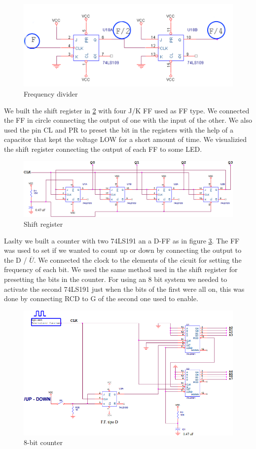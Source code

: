 \begin{figure}[H]
\centering
\includegraphics[width=.7\textwidth]{11/f_div.png}
\caption{Frequency divider}\label{f_div}
\end{figure}
We built the shift register in \ref{shift_reg} with four J/K FF used as FF type. We connected the FF in circle connecting the output of one with the input of the other. We also used the pin CL and PR to preset the bit in the registers with the help of a capacitor that kept the voltage LOW for a short amount of time. We visualizied the shift register connecting the output of each FF to some LED.
\begin{figure}[H]
\centering
\includegraphics[width=.7\textwidth]{11/shift_reg.png}
\caption{Shift register}\label{shift_reg}

\end{figure}
Laslty we built a counter with two 74LS191 an a D-FF as in figure \ref{count}. The FF was  used to set if we wanted to count up or down by connecting the output to the D / $\overline{U}$. We connected the clock to the elements of the cicuit for  setting the frequency of each bit. We used the same method used in the shift register for presetting the bits in the counter. For using an 8 bit system we needed to activate the second 74LS191 just when the bits of the first were all on, this was done by connecting RCD to G of the second one used to enable.
\begin{figure}[H]
\centering
\includegraphics[width=.7\textwidth]{11/count.png}
\caption{8-bit counter}\label{count}
\end{figure}


